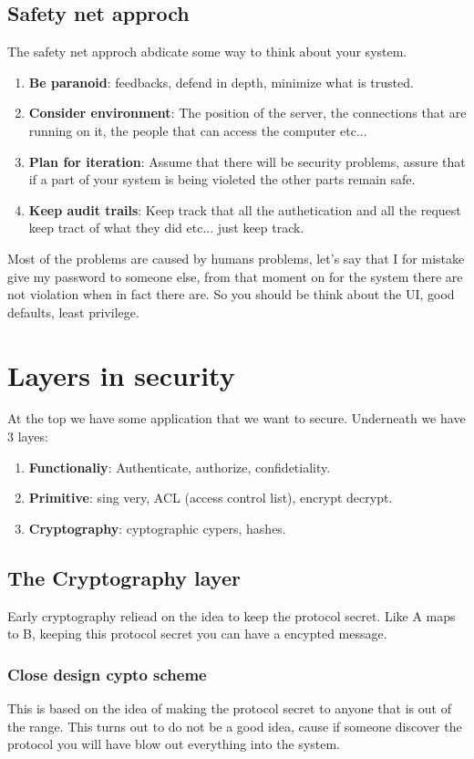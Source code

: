\documentclass{article}
\begin{document}
    \subsection{Safety net approch}
      The safety net approch abdicate some way to think about your system.
      \begin{enumerate}
        \item\textbf{Be paranoid}: feedbacks, defend in depth, minimize what is trusted.
        \item\textbf{Consider environment}: The position of the server, 
          the connections that are running on it, the people that can access the computer etc...
        \item\textbf{Plan for iteration}: Assume that there will be security problems, assure that 
          if a part of your system is being violeted the other parts remain safe.
        \item\textbf{Keep audit trails}: Keep track that all the authetication and all the request
          keep tract of what they did etc... just keep track.
      \end{enumerate}
    Most of the problems are caused by humans problems, let's say that I for mistake give my 
    password to someone else, from that moment on for the system there are not violation when
    in fact there are. So you should be think about the UI, good defaults, least privilege.
  \section{Layers in security}
    At the top we have some application that we want to secure. Underneath we have 3 layes:
    \begin{enumerate}
      \item\textbf{Functionaliy}: Authenticate, authorize, confidetiality.
      \item\textbf{Primitive}: sing very, ACL (access control list), encrypt decrypt.
      \item\textbf{Cryptography}: cyptographic cypers, hashes. 
    \end{enumerate}
    \subsection{The Cryptography layer} 
      Early cryptography reliead on the idea to keep the protocol secret. Like A maps to B, 
      keeping this protocol secret you can have a encypted message.
      \subsubsection{Close design cypto scheme}
        This is based on the idea of making the protocol secret to anyone that is out of the 
        range. This turns out to do not be a good idea, cause if someone discover the protocol 
        you will have blow out everything into the system.
\end{document}
